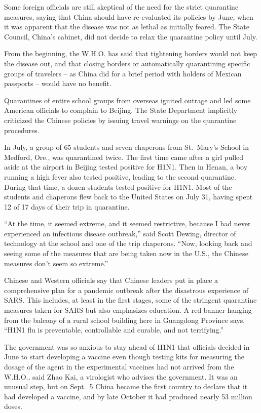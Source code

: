 ﻿\documentclass[12pt]{article}
\begin{document}
Some foreign officials are still skeptical of the need for the strict quarantine measures, saying
that China should have re-evaluated its policies by June, when it was apparent that the disease was
not as lethal as initially feared. The State Council, China's cabinet, did not decide to relax the
quarantine policy until July.

From the beginning, the W.H.O. has said that tightening borders would not keep the disease out, and
that closing borders or automatically quarantining specific groups of travelers -- as China did for
a brief period with holders of Mexican passports -- would have no benefit.

Quarantines of entire school groups from overseas ignited outrage and led some American officials to
complain to Beijing. The State Department implicitly criticized the Chinese policies by issuing
travel warnings on the quarantine procedures.

In July, a group of 65 students and seven chaperons from St.~Mary's School in Medford, Ore., was
quarantined twice. The first time came after a girl pulled aside at the airport in Beijing tested
positive for H1N1. Then in Henan, a boy running a high fever also tested positive, leading to the
second quarantine. During that time, a dozen students tested positive for H1N1. Most of the students
and chaperons flew back to the United States on July 31, having spent 12 of 17 days of their trip in
quarantine.

``At the time, it seemed extreme, and it seemed restrictive, because I had never experienced an
infectious disease outbreak,'' said Scott Dewing, director of technology at the school and one of
the trip chaperons. ``Now, looking back and seeing some of the measures that are being taken now in
the U.S., the Chinese measures don't seem so extreme.''

Chinese and Western officials say that Chinese leaders put in place a comprehensive plan for a
pandemic outbreak after the disastrous experience of SARS. This includes, at least in the first
stages, some of the stringent quarantine measures taken for SARS but also emphasizes education. A
red banner hanging from the balcony of a rural school building here in Guangdong Province says,
``H1N1 flu is preventable, controllable and curable, and not terrifying.''

The government was so anxious to stay ahead of H1N1 that officials decided in June to start
developing a vaccine even though testing kits for measuring the dosage of the agent in the
experimental vaccines had not arrived from the W.H.O., said Zhao Kai, a virologist who advises the
government. It was an unusual step, but on Sept.~5 China became the first country to declare that it
had developed a vaccine, and by late October it had produced nearly 53 million doses.
\end{document}
